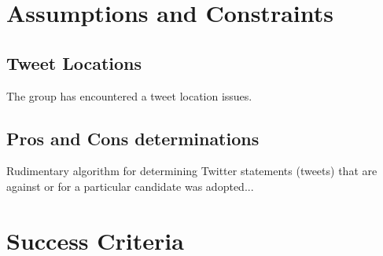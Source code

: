 \documentclass[12pt]{article} %
\begin{document}
	
	
	

	

	
	
	
	
	\section{Assumptions and Constraints}
	
	\subsection{Tweet Locations}
	The group has encountered a tweet location issues. \\
	\subsection{Pros and Cons determinations}
	Rudimentary algorithm for determining Twitter statements (tweets) that are against or for a particular candidate was adopted... \\
	
	
	

	
	
	
	\section{Success Criteria} %
	
\end{document}
